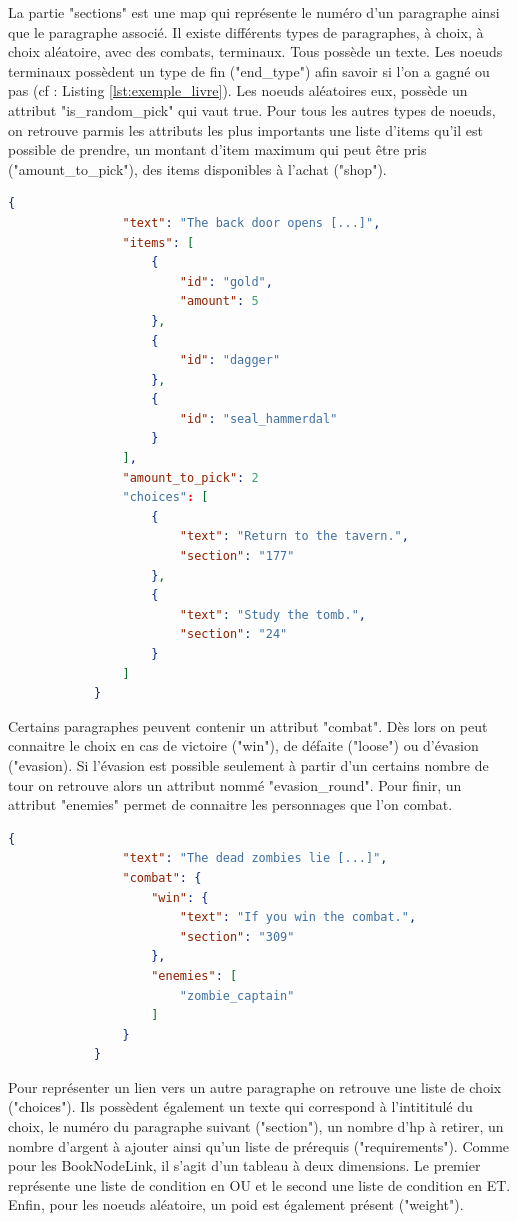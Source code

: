 			La partie "sections" est une map qui représente le numéro d'un paragraphe ainsi que le paragraphe associé. Il existe différents types de paragraphes, à choix, à choix aléatoire, avec des combats, terminaux. Tous possède un texte. Les noeuds terminaux possèdent un type de fin ("end\_type") afin savoir si l'on a gagné ou pas (cf : Listing \ref{lst:exemple_livre}). Les noeuds aléatoires eux, possède un attribut "is\_random\_pick" qui vaut true. Pour tous les autres types de noeuds, on retrouve parmis les attributs les plus importants une liste d'items qu'il est possible de prendre, un montant d'item maximum qui peut être pris ("amount\_to\_pick"), des items disponibles à l'achat ("shop").

			\begin{lstlisting}[gobble=12, language=json, caption=Exemple de paragraphe]
			{
				"text": "The back door opens [...]",
				"items": [
					{
						"id": "gold",
						"amount": 5
					},
					{
						"id": "dagger"
					},
					{
						"id": "seal_hammerdal"
					}
				],
				"amount_to_pick": 2
				"choices": [
					{
						"text": "Return to the tavern.",
						"section": "177"
					},
					{
						"text": "Study the tomb.",
						"section": "24"
					}
				]
			}
			\end{lstlisting}

			Certains paragraphes peuvent contenir un attribut "combat". Dès lors on peut connaitre le choix en cas de victoire ("win"), de défaite ("loose") ou d'évasion ("evasion). Si l'évasion est possible seulement à partir d'un certains nombre de tour on retrouve alors un attribut nommé "evasion\_round". Pour finir, un attribut "enemies" permet de connaitre les personnages que l'on combat.

			\begin{lstlisting}[gobble=12, language=json, caption=Exemple de paragraphe avec des combats]
			{
				"text": "The dead zombies lie [...]",
				"combat": {
					"win": {
						"text": "If you win the combat.",
						"section": "309"
					},
					"enemies": [
						"zombie_captain"
					]
				}
			}
			\end{lstlisting}

			Pour représenter un lien vers un autre paragraphe on retrouve une liste de choix ("choices"). Ils possèdent également un texte qui correspond à l'intititulé du choix, le numéro du paragraphe suivant ("section"), un nombre d'hp à retirer, un nombre d'argent à ajouter ainsi qu'un liste de prérequis ("requirements"). Comme pour les BookNodeLink, il s'agit d'un tableau à deux dimensions. Le premier représente une liste de condition en OU et le second une liste de condition en ET. Enfin, pour les noeuds aléatoire, un poid est également présent ("weight").

